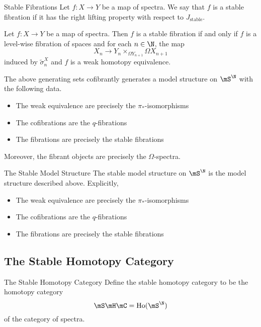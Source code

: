\documentclass[a4paper]{article}
\begin{document}
\begin{defn}{Stable Fibrations}{} Let $f:X\to Y$ be a map of spectra. We say that $f$ is a stable fibration if it has the right lifting property with respect to $J_\text{stable}$. 
\end{defn}

\begin{prp}{}{} Let $f:X\to Y$ be a map of spectra. Then $f$ is a stable fibration if and only if $f$ is a level-wise fibration of spaces and for each $n\in\N$, the map $$X_n\to Y_n\times_{\Omega Y_{n+1}}\Omega X_{n+1}$$ induced by $\widetilde{\sigma}_n^X$ and $f$ is a weak homotopy equivalence. 
\end{prp}

\begin{thm}{}{} The above generating sets cofibrantly generates a model structure on $\mS^\N$ with the following data. 
\begin{itemize}
\item The weak equivalence are precisely the $\pi_\ast$-isomorphisms
\item The cofibrations are the $q$-fibrations
\item The fibrations are precisely the stable fibrations
\end{itemize}
Moreover, the fibrant objects are precisely the $\Omega$-spectra. 
\end{thm}

\begin{defn}{The Stable Model Structure}{} The stable model structure on $\mS^\N$ is the model structure described above. Explicitly, 
\begin{itemize}
\item The weak equivalence are precisely the $\pi_\ast$-isomorphisms
\item The cofibrations are the $q$-fibrations
\item The fibrations are precisely the stable fibrations
\end{itemize}
\end{defn}

\subsection{The Stable Homotopy Category}
\begin{defn}{The Stable Homotopy Category}{} Define the stable homotopy category to be the homotopy category $$\mS\mH\mC=\text{Ho}(\mS^\N)$$ of the category of spectra. 
\end{defn}
\end{document}
